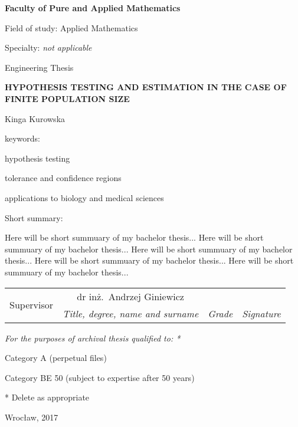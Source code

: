\documentclass[12pt,a4paper,twoside]{book}
\begin{document}
\begin{titlepage}
\noindent\textbf{\large Faculty of Pure and Applied Mathematics}
\par\medskip\noindent
Field of study: Applied Mathematics
\par\noindent
Specialty: \textit{not applicable}
\vspace*{36pt}
\begin{center}
\LARGE Engineering Thesis
\end{center}
\vspace*{24pt}
\begin{center}
\uppercase{\Large\bfseries%
Hypothesis Testing and Estimation in the Case of Finite Population Size}
\end{center}
\vspace*{12pt}
\begin{center}
Kinga Kurowska
\end{center}
\vspace*{12pt}
\begin{flushright}
keywords:\par\noindent
hypothesis testing\par\noindent
tolerance and confidence regions\par\noindent
applications to biology and medical sciences \par\noindent
\end{flushright}
\begin{flushleft}
Short summary:\par
Here will be short summuary of my bachelor thesis... Here will be short summuary of my bachelor thesis... Here will be short summuary of my bachelor thesis... Here will be short summuary of my bachelor thesis... Here will be short summuary of my bachelor thesis...
\smallskip
\end{flushleft}
\begin{tabularx}{\textwidth}{|l|c|X|X|}
	\hline
	\multirow{2}{*}{\footnotesize Supervisor} & {\small dr inż.\ Andrzej Giniewicz} &  &  \\
	\cline{2-4}
	& \textit{\footnotesize Title, degree, name and surname} & \textit{\footnotesize Grade} & \textit{\footnotesize Signature} \\
	\hline
\end{tabularx}
\smallskip
\begin{flushleft}
\small\itshape
For the purposes of archival thesis qualified to: *
\begin{compactenum}
\item Category A (perpetual files)
\item Category BE 50 (subject to expertise after 50 years)
\end{compactenum}
* Delete as appropriate
\end{flushleft}
\vspace*{12pt}
\begin{flushright}
\end{flushright}
\vspace*{12pt}
\begin{center}
Wrocław, 2017
\end{center}
\end{titlepage}
\restoregeometry
\end{document}
